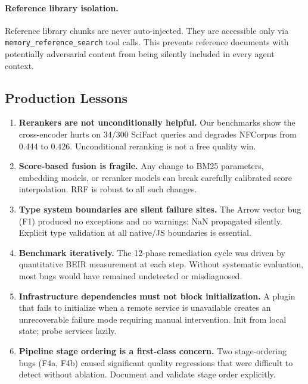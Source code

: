 \documentclass[11pt]{article}
\begin{document}
\paragraph{Reference library isolation.}
Reference library chunks are never auto-injected. They are accessible only via
\texttt{memory\_reference\_search} tool calls. This prevents reference documents with
potentially adversarial content from being silently included in every agent context.

\subsection{Production Lessons}

\begin{enumerate}[leftmargin=2em, itemsep=4pt]
  \item \textbf{Rerankers are not unconditionally helpful.} Our benchmarks show the
  cross-encoder hurts on 34/300 SciFact queries and degrades NFCorpus from 0.444 to
  0.426. Unconditional reranking is not a free quality win.

  \item \textbf{Score-based fusion is fragile.} Any change to BM25 parameters, embedding
  models, or reranker models can break carefully calibrated score interpolation. RRF is
  robust to all such changes.

  \item \textbf{Type system boundaries are silent failure sites.} The Arrow vector bug
  (F1) produced no exceptions and no warnings; NaN propagated silently. Explicit type
  validation at all native/JS boundaries is essential.

  \item \textbf{Benchmark iteratively.} The 12-phase remediation cycle was driven by
  quantitative BEIR measurement at each step. Without systematic evaluation, most bugs
  would have remained undetected or misdiagnosed.

  \item \textbf{Infrastructure dependencies must not block initialization.} A plugin
  that fails to initialize when a remote service is unavailable creates an unrecoverable
  failure mode requiring manual intervention. Init from local state; probe services
  lazily.

  \item \textbf{Pipeline stage ordering is a first-class concern.} Two stage-ordering
  bugs (F4a, F4b) caused significant quality regressions that were difficult to detect
  without ablation. Document and validate stage order explicitly.
\end{enumerate}
\end{document}
